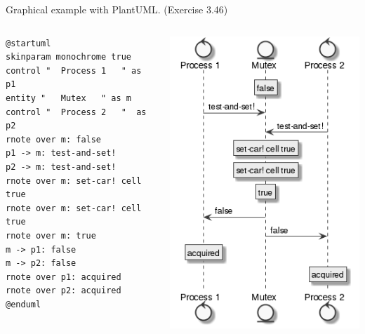 \documentclass[presentation, CJK, compress,aspectratio=169]{beamer}
\begin{document}
\begin{frame}[label={sec:orgc10bdc8},fragile]{Graphical example with PlantUML. (Exercise 3.46)}
 \begin{columns}[t]
\begin{column}{0.5\columnwidth}
\lstset{numbers=none,frame=single,basicstyle=\footnotesize\ttfamily ,keywordstyle=\ttfamily,upquote=true,extendedchars=true,language=MetaPost,label= ,caption= ,captionpos=b}
\begin{lstlisting}
@startuml
skinparam monochrome true
control "  Process 1   " as p1
entity "   Mutex   " as m
control "  Process 2   "  as p2
rnote over m: false
p1 -> m: test-and-set!
p2 -> m: test-and-set!
rnote over m: set-car! cell true
rnote over m: set-car! cell true
rnote over m: true
m -> p1: false
m -> p2: false
rnote over p1: acquired
rnote over p2: acquired
@enduml
\end{lstlisting}
\end{column}


\begin{column}{0.3\columnwidth}
\begin{center}
\includegraphics[width=.9\linewidth]{exercise-3-46.png}
\end{center}
\end{column}
\end{columns}



\end{frame}
\end{document}
